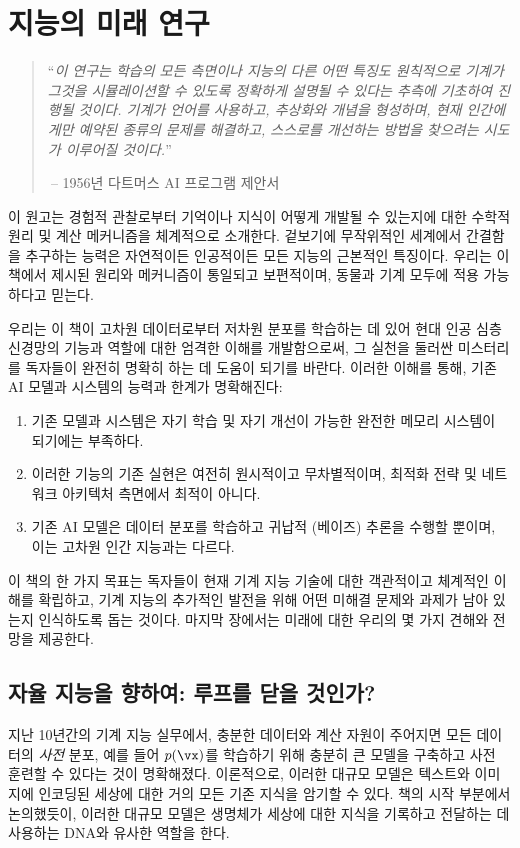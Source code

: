 \documentclass[../../book-main_ko.tex]{subfiles}
\begin{document}
\chapter{지능의 미래 연구}
\label{ch:future}

\begin{quote}
``{\em 이 연구는 학습의 모든 측면이나 지능의 다른 어떤 특징도 원칙적으로 기계가 그것을 시뮬레이션할 수 있도록 정확하게 설명될 수 있다는 추측에 기초하여 진행될 것이다. 기계가 언어를 사용하고, 추상화와 개념을 형성하며, 현재 인간에게만 예약된 종류의 문제를 해결하고, 스스로를 개선하는 방법을 찾으려는 시도가 이루어질 것이다.}''

$~$\hfill -- 1956년 다트머스 AI 프로그램 제안서
 \end{quote}
\vspace{5mm}


이 원고는 경험적 관찰로부터 기억이나 지식이 어떻게 개발될 수 있는지에 대한 수학적 원리 및 계산 메커니즘을 체계적으로 소개한다. 겉보기에 무작위적인 세계에서 간결함을 추구하는 능력은 자연적이든 인공적이든 모든 지능의 근본적인 특징이다. 우리는 이 책에서 제시된 원리와 메커니즘이 통일되고 보편적이며, 동물과 기계 모두에 적용 가능하다고 믿는다.

우리는 이 책이 고차원 데이터로부터 저차원 분포를 학습하는 데 있어 현대 인공 심층 신경망의 기능과 역할에 대한 엄격한 이해를 개발함으로써, 그 실천을 둘러싼 미스터리를 독자들이 완전히 명확히 하는 데 도움이 되기를 바란다. 이러한 이해를 통해, 기존 AI 모델과 시스템의 능력과 한계가 명확해진다:
\begin{enumerate}
    \item 기존 모델과 시스템은 자기 학습 및 자기 개선이 가능한 완전한 메모리 시스템이 되기에는 부족하다.
    \item 이러한 기능의 기존 실현은 여전히 원시적이고 무차별적이며, 최적화 전략 및 네트워크 아키텍처 측면에서 최적이 아니다.
    \item 기존 AI 모델은 데이터 분포를 학습하고 귀납적 (베이즈) 추론을 수행할 뿐이며, 이는 고차원 인간 지능과는 다르다.
\end{enumerate}

이 책의 한 가지 목표는 독자들이 현재 기계 지능 기술에 대한 객관적이고 체계적인 이해를 확립하고, 기계 지능의 추가적인 발전을 위해 어떤 미해결 문제와 과제가 남아 있는지 인식하도록 돕는 것이다. 마지막 장에서는 미래에 대한 우리의 몇 가지 견해와 전망을 제공한다.

\section{자율 지능을 향하여: 루프를 닫을 것인가?}
지난 10년간의 기계 지능 실무에서, 충분한 데이터와 계산 자원이 주어지면 모든 데이터의 \textit{사전} 분포, 예를 들어 \(p(\vx)\)를 학습하기 위해 충분히 큰 모델을 구축하고 사전 훈련할 수 있다는 것이 명확해졌다. 이론적으로, 이러한 대규모 모델은 텍스트와 이미지에 인코딩된 세상에 대한 거의 모든 기존 지식을 암기할 수 있다. 책의 시작 부분에서 논의했듯이, 이러한 대규모 모델은 생명체가 세상에 대한 지식을 기록하고 전달하는 데 사용하는 DNA와 유사한 역할을 한다.
\end{document}
